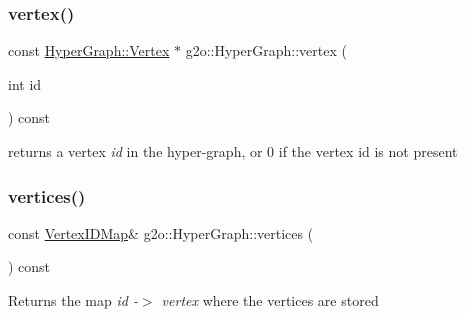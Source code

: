 \mbox{\label{classg2o_1_1_hyper_graph_ac117806d17a7e7ad7f8db42f2864cac9}} 
\subsubsection{\texorpdfstring{vertex()}{vertex()}\hspace{0.1cm}{\footnotesize\ttfamily [2/2]}}
{\footnotesize\ttfamily const \mbox{\hyperlink{classg2o_1_1_hyper_graph_1_1_vertex}{Hyper\+Graph\+::\+Vertex}} $\ast$ g2o\+::\+Hyper\+Graph\+::vertex (\begin{DoxyParamCaption}\item[{int}]{id }\end{DoxyParamCaption}) const}



returns a vertex {\itshape id} in the hyper-\/graph, or 0 if the vertex id is not present 

\mbox{\label{classg2o_1_1_hyper_graph_a95fcf7cd9d89562b2c26d99ede3548ed}} 
\subsubsection{\texorpdfstring{vertices()}{vertices()}\hspace{0.1cm}{\footnotesize\ttfamily [1/2]}}
{\footnotesize\ttfamily const \mbox{\hyperlink{classg2o_1_1_hyper_graph_a97307eac064ebf4b3e2cfbf0718035b5}{Vertex\+I\+D\+Map}}\& g2o\+::\+Hyper\+Graph\+::vertices (\begin{DoxyParamCaption}{ }\end{DoxyParamCaption}) const\hspace{0.3cm}{\ttfamily [inline]}}

\begin{DoxyReturn}{Returns}
the map {\itshape id -\/$>$ vertex} where the vertices are stored 
\end{DoxyReturn}
\mbox{\label{classg2o_1_1_hyper_graph_a650107c875ef6f43d438d7d3e2ddf797}} 

